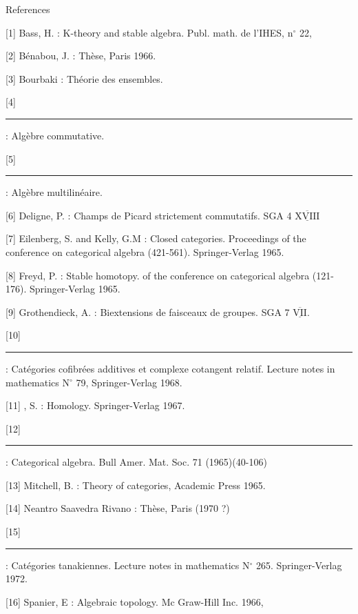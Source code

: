 \begin{center}References\end{center}

[1] Bass, H. : K-theory and stable algebra. Publ. math. de l'IHES, n$^\circ$ 22,

[2] Bénabou, J. : Thèse, Paris 1966.

[3] Bourbaki : Théorie des ensembles.

[4] \rule[.25ex]{3em}{.45pt} : Algèbre commutative.

[5] \rule[.25ex]{3em}{.45pt} : Algèbre multilinéaire.

[6] Deligne, P. : Champs de Picard strictement commutatifs. SGA 4 $\overline{\underline{\mathrm{XVIII}}}$

[7] Eilenberg, S. and Kelly, G.M : Closed categories. Proceedings of the conference on categorical algebra (421-561). Springer-Verlag 1965.

[8] Freyd, P. : Stable homotopy.  of the conference on categorical algebra (121-176). Springer-Verlag 1965.

[9] Grothendieck, A. : Biextensions de faisceaux de groupes. SGA 7 $\overline{\underline{\mathrm{VII}}}$.

[10] \rule[.25ex]{2.2em}{.45pt} : Catégories cofibrées additives et complexe cotangent relatif. Lecture notes in mathematics N$^\circ$ 79, Springer-Verlag 1968.

[11] , S. : Homology. Springer-Verlag 1967.

[12] \rule[.25ex]{2.3em}{.45pt} : Categorical algebra. Bull Amer. Mat. Soc. 71 (1965)(40-106)

[13] Mitchell, B. : Theory of categories, Academic Press 1965.

[14] Neantro Saavedra Rivano : Thèse, Paris (1970 ?)

[15] \rule[.25ex]{2em}{.45pt} : Catégories tanakiennes. Lecture notes in mathematics N$^\circ$ 265. Springer-Verlag 1972.

[16] Spanier, E : Algebraic topology. Mc Graw-Hill Inc. 1966,
